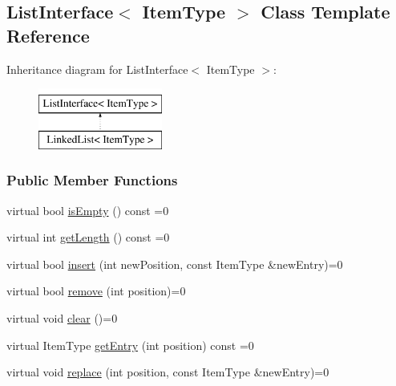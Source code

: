 \hypertarget{class_list_interface}{\subsection{List\-Interface$<$ Item\-Type $>$ Class Template Reference}
\label{class_list_interface}
}
Inheritance diagram for List\-Interface$<$ Item\-Type $>$\-:\begin{figure}[H]
\begin{center}
\leavevmode
\includegraphics[height=2.000000cm]{class_list_interface}
\end{center}
\end{figure}
\subsubsection*{Public Member Functions}
\begin{DoxyCompactItemize}
\item 
virtual bool \hyperlink{class_list_interface_a924f91e7f81d7dcd3fda79bbcc671394}{is\-Empty} () const =0
\item 
virtual int \hyperlink{class_list_interface_afc85695d4137f1e29ff02e179c9f3221}{get\-Length} () const =0
\item 
virtual bool \hyperlink{class_list_interface_a5b2f86954a86172699a3495982c38e77}{insert} (int new\-Position, const Item\-Type \&new\-Entry)=0
\item 
virtual bool \hyperlink{class_list_interface_a5543002ec0d64bd2a63f3732f437af65}{remove} (int position)=0
\item 
virtual void \hyperlink{class_list_interface_adfda414908b645bdf19bcab8269168b7}{clear} ()=0
\item 
virtual Item\-Type \hyperlink{class_list_interface_a86987f69e5056d287212ede41db1956a}{get\-Entry} (int position) const =0
\item 
virtual void \hyperlink{class_list_interface_aae877a56b7b9f5f526c37a00e234fad1}{replace} (int position, const Item\-Type \&new\-Entry)=0
\end{DoxyCompactItemize}


